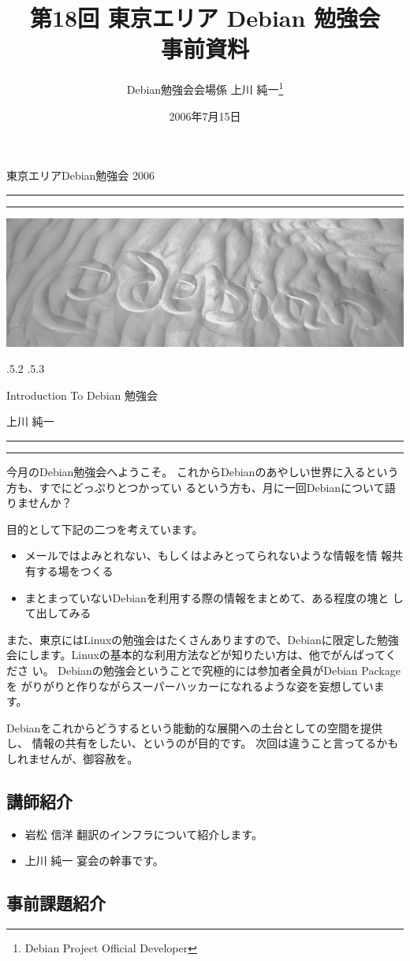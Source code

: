 \documentclass[mingoth,a4paper]{jsarticle}
\makeatletter
\renewcommand{\section}{\@startsection{section}{1}{\z@}%
    {\Cvs \@plus.5\Cdp \@minus.2\Cdp}%
    {.5\Cvs \@plus.3\Cdp}%
    {\normalfont\Huge\headfont\raggedright\centering}} %
\newcommand{\dancersection}[2]{%
\newpage
東京エリアDebian勉強会 2006
\hrule
\vspace{0.5mm}
\hrule
\hfill{}\includegraphics[width=16cm]{image2006-natsu/guruguru-sand-light.png}\\
\vspace{-5cm}
\begin{center}
\section{#1}
\end{center}
\hfill{}\colorbox{white}{#2}\hspace{3cm}\space\\
\vspace{1cm}
\hrule
\vspace{0.5mm}
\hrule
\vspace{1cm}
}
\makeatother
\begin{document}
\begin{titlepage}

\title{
 第18回 東京エリア Debian 勉強会\\事前資料}
\date{2006年7月15日}
\author{Debian勉強会会場係 上川 純一\thanks{Debian Project Official Developer}} 
\maketitle
\thispagestyle{empty}
\end{titlepage}

\newpage
\tableofcontents

\dancersection{Introduction To Debian 勉強会}{上川 純一}

今月のDebian勉強会へようこそ。
これからDebianのあやしい世界に入るという方も、すでにどっぷりとつかってい
るという方も、月に一回Debianについて語りませんか？

目的として下記の二つを考えています。

\begin{itemize}
 \item メールではよみとれない、もしくはよみとってられないような情報を情
       報共有する場をつくる
 \item まとまっていないDebianを利用する際の情報をまとめて、ある程度の塊と
       して出してみる
\end{itemize}

また、東京にはLinuxの勉強会はたくさんありますので、Debianに限定した勉強
会にします。Linuxの基本的な利用方法などが知りたい方は、他でがんばってくださ
い。
Debianの勉強会ということで究極的には参加者全員がDebian Packageを
がりがりと作りながらスーパーハッカーになれるような姿を妄想しています。

Debianをこれからどうするという能動的な展開への土台としての空間を提供し、
情報の共有をしたい、というのが目的です。
次回は違うこと言ってるかもしれませんが、御容赦を。

\subsection{講師紹介}

\begin{itemize}
 \item{岩松 信洋} 翻訳のインフラについて紹介します。
 \item{上川 純一} 宴会の幹事です。
\end{itemize}

\subsection{事前課題紹介}
\end{document}
